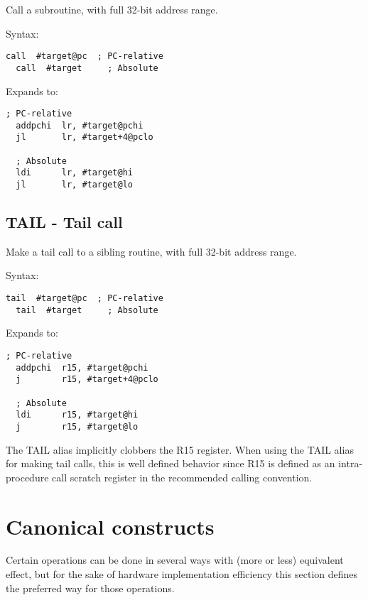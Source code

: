 Call a subroutine, with full 32-bit address range.

Syntax:
\begin{lstlisting}[style=assembler]
  call  #target@pc  ; PC-relative
  call  #target     ; Absolute
\end{lstlisting}

Expands to:
\begin{lstlisting}[style=assembler]
  ; PC-relative
  addpchi  lr, #target@pchi
  jl       lr, #target+4@pclo

  ; Absolute
  ldi      lr, #target@hi
  jl       lr, #target@lo
\end{lstlisting}

\subsection{TAIL - Tail call}

Make a tail call to a sibling routine, with full 32-bit address range.

Syntax:
\begin{lstlisting}[style=assembler]
  tail  #target@pc  ; PC-relative
  tail  #target     ; Absolute
\end{lstlisting}

Expands to:
\begin{lstlisting}[style=assembler]
  ; PC-relative
  addpchi  r15, #target@pchi
  j        r15, #target+4@pclo

  ; Absolute
  ldi      r15, #target@hi
  j        r15, #target@lo
\end{lstlisting}

\begin{notebox}
The TAIL alias implicitly clobbers the R15 register. When using the TAIL alias
for making tail calls, this is well defined behavior since R15 is defined as an
intra-procedure call scratch register in the recommended calling convention.
\end{notebox}

\section{Canonical constructs}

Certain operations can be done in several ways with (more or less) equivalent
effect, but for the sake of hardware implementation efficiency this section
defines the preferred way for those operations.

\tbd
